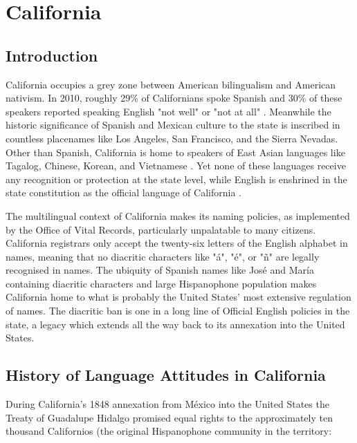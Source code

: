 \section{California}

\subsection{Introduction}

California occupies a grey zone between American bilingualism and American
nativism. In 2010, roughly 29\% of Californians spoke Spanish and 30\% of these
speakers reported speaking English "not well" or "not at all"
\parencite{acs-lang-states}. Meanwhile the historic significance of Spanish and
Mexican culture to the state is inscribed in countless placenames like Los
Angeles, San Francisco, and the Sierra Nevadas. Other than Spanish, California
is home to speakers of East Asian languages like Tagalog, Chinese, Korean, and
Vietnamese \parencite{acs-lang-states}. Yet none of these languages receive any
recognition or protection at the state level, while English is enshrined in the
state constitution as the official language of California \parencite{ca-const}.

The multilingual context of California makes its naming policies, as
implemented by the Office of Vital Records, particularly unpalatable to many
citizens. California registrars only accept the twenty-six letters of the
English alphabet in names, meaning that no diacritic characters like "á", "é",
or "ñ" are legally recognised in names. The ubiquity of Spanish names like José
and María containing diacritic characters and large Hispanophone population
makes California home to what is probably the United States' most extensive
regulation of names. The diacritic ban is one in a long line of Official
English policies in the state, a legacy which extends all the way back to its
annexation into the United States.

\subsection{History of Language Attitudes in California}

During California's 1848 annexation from México into the United States the
Treaty of Guadalupe Hidalgo promised equal rights to the approximately ten
thousand Californios (the original Hispanophone community in the territory:

